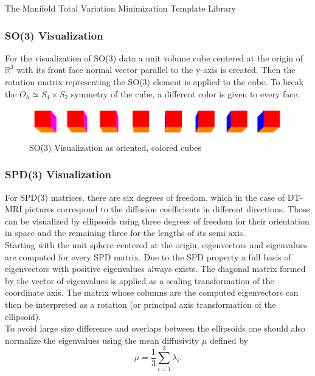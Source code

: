 \begin{chapter}{The Manifold Total Variation Minimization Template Library}
\subsubsection{SO(3) Visualization} %
\label{ssub:SO(3) Visualization}
For the visualization of SO(3) data a unit volume cube centered at the origin of $\mathbb{R}^3$ with its front face normal vector parallel to the y-axis is created.
Then the rotation matrix representing the SO(3) element is applied to the cube. To break the $O_h \simeq S_4\times S_2$ symmetry of the cube, a different color is given to 
every face.

\begin{figure}[h!]
        \centering
	    \includegraphics[width=0.8\linewidth]{./figures/library/cubes.pdf}
	    \caption[SO(3) cube visualization]{SO(3) Visualization as oriented, colored cubes}
	\label{fig:cube_visualization}
\end{figure}

\subsubsection{SPD(3) Visualization} %
\label{ssub:SPD(3) Visualization}
For SPD(3) matrices. there are six degrees of freedom, which in the case of DT-MRI pictures correspond to the diffusion coefficients in different directions.
Those can be visualized by ellipsoids using three degrees of freedom for their orientation in space and the remaining three for the lengths of its semi-axis.\\
Starting with the unit sphere centered at the origin, eigenvectors and eigenvalues are computed for every SPD matrix. Due to the SPD property a full basis of eigenvectors
with positive eigenvalues always exists. The diagonal matrix formed by the vector of eigenvalues is applied as a scaling transformation of the coordinate axis. The matrix
whose columns are the computed eigenvectors can then be interpreted as a rotation (or principal axis transformation of the ellipsoid).\\
To avoid large size difference and overlaps between the ellipsoids one should also normalize the eigenvalues using the mean diffusivity $\mu$ defined by
\begin{equation}
    \mu = \frac{1}{3} \sum_{i=1}^{3}\lambda_i.
\end{equation}


\end{chapter}
